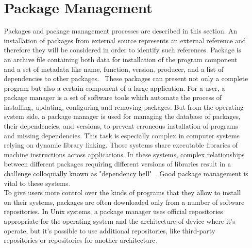 \section{Package Management} \label{sec:pm}
Packages and package management processes are described in this section.
An installation of packages from external source represents an external reference and therefore they will be considered in order to identify such references.
Package is an archive file containing both data for installation of the program component and a set of metadata like name, function, version, producer, and a list of dependencies to other packages.~\cite*{opium}
These packages can present not only a complete program but also a certain component of a large application. %
For a user, a package manager is a set of software tools which automate the process of installing, updating, configuring and removing packages.
But from the operating system side, a package manager is used for managing the database of packages, their dependencies, and versions, to prevent erroneous installation of programs and missing dependencies.
This task is especially complex in computer systems relying on dynamic library linking. 
Those systems share executable libraries of machine instructions across  applications. 
In these systems, complex relationships between different packages requiring different versions of libraries result in a challenge colloquially known as "dependency hell"~\cite*{linuxgeek}.
Good package management is vital to these systems.\\
To give users more control over the kinds of programs that they allow to install on their systems, packages are often downloaded only from a number of software repositories.
In Unix systems, a package manager uses official repositories appropriate for the operating system and the architecture  of device where it's operate, but it's possible to use additional repositories, like third-party repositories or repositories for another architecture.\\
